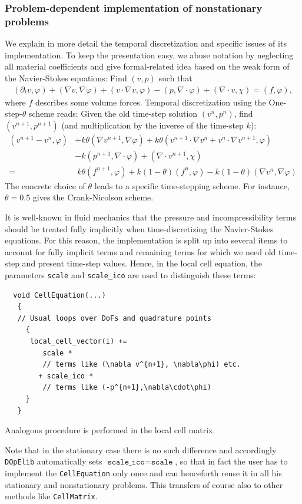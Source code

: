 \documentclass[smallextended]{svjour3}       %
\numberwithin{equation}{section}
\renewcommand{\phi}{\varphi}
\newcommand{\dope}{\texttt{DOpElib}}
\begin{document}
\subsubsection{Problem-dependent 
implementation of nonstationary problems}
\label{sec:timedep:implementation}
We explain in more detail the temporal discretization
and specific issues of its implementation. 
To keep the presentation easy, we abuse notation 
by neglecting
all material coefficients
and give formal-related idea based on the weak 
form of the Navier-Stokes equations:
Find $(v,p)$ such that
\begin{align*}
(\partial_t v,\phi) 
+ (\nabla v, \nabla \phi)
+ (v\cdot\nabla v,\phi)
-(p,\nabla\cdot \phi)
+(\nabla\cdot v, \chi)
=(f,\phi),
\end{align*}
where $f$ describes some volume forces.
Temporal discretization using the One-step-$\theta$ scheme reads:
Given the old time-step solution $(v^n,p^n)$, 
find $(v^{n+1}, p^{n+1})$ (and multiplication 
by the inverse of the time-step $k$):
\begin{align*}
(v^{n+1} - v^{n}, \phi)
&+ k\theta (\nabla v^{n+1}, \nabla \phi)
+ k\theta (v^{n+1}\cdot\nabla v^n + 
  v^{n}\cdot\nabla v^{n+1},\phi)\\
&- k (p^{n+1},\nabla\cdot \phi)
+ (\nabla\cdot v^{n+1}, \chi)\\
=&\; k\theta (f^{n+1},\phi) + k(1-\theta) (f^{n},\phi)
- k(1-\theta) (\nabla v^{n}, \nabla \phi) 
\end{align*}
The concrete choice of $\theta$ leads to a
specific time-stepping scheme. For instance,
$\theta = 0.5$ gives the Crank-Nicolson scheme.

It is well-known in fluid mechanics that the pressure and incompressibility terms should be 
treated fully implicitly when time-discretizing 
the Navier-Stokes equations.
For this reason, the implementation is split up
into several items to account for fully implicit 
terms and remaining terms for which we need 
old time-step and present time-step values. 
Hence, in the local cell equation, the parameters
\texttt{scale} and \texttt{scale\_ico}
are used to distinguish these terms:
\begin{lstlisting}
  void CellEquation(...)
   {
   // Usual loops over DoFs and quadrature points
     {
      local_cell_vector(i) += 
         scale * 
         // terms like (\nabla v^{n+1}, \nabla\phi) etc.
        + scale_ico *
         // terms like (-p^{n+1},\nabla\cdot\phi)
     }
   }
\end{lstlisting}
Analogous procedure is performed in the local 
cell matrix.
\begin{remark}
Note that in the stationary case there is no such difference and accordingly 
\dope{} automatically sets $ \texttt{scale\_ico} = \texttt{scale}$, so that in fact the user has to implement the \texttt{CellEquation} only once and can henceforth reuse it in all his stationary and nonstationary problems. This transfers of course also to other methods like \texttt{CellMatrix}.
\end{remark}
\end{document}
